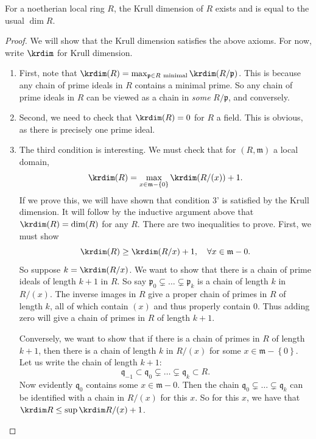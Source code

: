 \begin{theorem} 
For a noetherian local ring $R$, the Krull dimension of $R$ exists and is equal
to the usual $\dim R$.
\end{theorem}
\begin{proof} 
We will show that the Krull dimension satisfies the above axioms. For now,
write $\krdim$ for Krull dimension.

\begin{enumerate}
\item First, note that $\krdim(R) = \max_{\mathfrak{p} \in R \
\mathrm{minimal}}  \krdim(R/\mathfrak{p})$. This is because any chain of prime
ideals in $R$ contains a minimal prime. So any chain of prime ideals in $R$ can
be viewed as a chain in \emph{some} $R/\mathfrak{p}$, and conversely.
\item Second, we need to check that $\krdim(R) = 0$ for $R$ a field. This is
obvious, as there is precisely one prime ideal.
\item The third condition is interesting. We must check that for $(R,
\mathfrak{m})$ a local
domain, 
\[ \krdim(R) = \max_{x \in \mathfrak{m} - \left\{0\right\}} \krdim(R/(x)) + 1.  \]
If we prove this, we will have shown that condition 3' is satisfied by the
Krull dimension. It will follow by the inductive argument above that $\krdim(R)
= \dim (R)$ for any $R$. 
There are two inequalities to prove. First, we must show
\[ \krdim(R) \geq \krdim(R/x) +1, \quad \forall x \in \mathfrak{m} - 0.  \]
So suppose $k = \krdim(R/x)$. We want to show that there is a chain of prime
ideals of length $k+1$ in $R$. So say $\mathfrak{p}_0 \subsetneq \dots
\subsetneq \mathfrak{p}_k$ is a chain of length $k$ in $R/(x)$. The inverse
images in $R$ give a proper chain of primes in $R$ of  length $k$, all of which
contain $(x)$ and thus properly contain $0$. Thus adding zero will give a chain
of primes in $R$ of length $k+1$. 

Conversely, we want to show that if there is a chain of primes in $R$ of
length  $k+1$, then there is a chain of length $k$ in $R/(x)$ for some $x \in
\mathfrak{m} - \left\{0\right\}$. Let us write the chain  of length $k+1$:
\[ \mathfrak{q}_{-1} \subset \mathfrak{q}_0 \subsetneq \dots \subsetneq
\mathfrak{q}_k \subset R . \]
Now evidently $\mathfrak{q}_0$ contains some $x \in \mathfrak{m} - 0$. Then the
chain $\mathfrak{q}_0 \subsetneq \dots \subsetneq \mathfrak{q}_k$ can be
identified with a chain in $R/(x)$ for this $x$. So for this $x$, we have that
$\krdim R \leq \sup \krdim R/(x) + 1$.
\end{enumerate}
\end{proof} 

